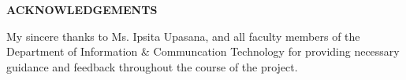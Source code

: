 \begin{center}
\large{\textbf{ACKNOWLEDGEMENTS}}\\
\vspace{1cm}
\end{center}
My sincere thanks to Ms. Ipsita Upasana, and all faculty members of the Department of Information \& Communcation Technology for providing necessary guidance and feedback throughout the course of the project. 

